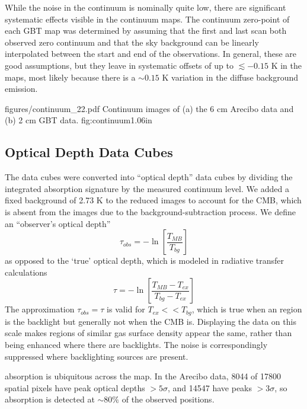 While the noise in the continuum is nominally quite low, there are significant
systematic effects visible in the continuum maps.  The continuum zero-point of
each GBT map was determined by assuming that the first and last scan both
observed zero continuum and that the sky background can be linearly
interpolated between the start and end of the observations.  In general, these
are good assumptions, but they leave in systematic offsets of up to
$\lesssim-0.15$ K in the maps, most likely because there is a $\sim0.15$ K
variation in the diffuse background  emission.



            {figures/continuum_22.pdf}
{Continuum images of (a) the 6 cm Arecibo data and (b) 2 cm GBT
data.} {fig:continuum}{1.0}{6in}




\subsection{Optical Depth Data Cubes}

The data cubes were converted into ``optical depth'' data cubes by dividing the
integrated \formaldehyde absorption signature by the measured continuum level.
We added a fixed background of 2.73 K to the reduced images to account for the
CMB, which is absent from the images due to the background-subtraction
process.  We define an ``observer's optical depth''
\begin{equation}
    \tau_{obs} = -\ln\left[\frac{T_{MB}}{T_{bg}}\right]
\end{equation}
as opposed to the `true' optical depth, which is modeled in radiative transfer
calculations
\begin{equation}
    \tau = -\ln\left[\frac{T_{MB}-T_{ex}}{T_{bg}-T_{ex}}\right]
\end{equation}
The approximation $\tau_{obs} = \tau$ is valid for $T_{ex} << T_{bg}$, which is
true when an \hii region is the backlight but generally not when the CMB is.
Displaying the data on this scale makes regions of similar gas surface density
appear the same, rather than being enhanced where there are backlights.  The
noise is correspondingly suppressed where backlighting sources are present.


\formaldehyde absorption is ubiquitous across the map.  In the Arecibo data,
8044 of 17800 spatial pixels have peak optical depths $>5\sigma$, and 14547
have peaks $>3\sigma$, so \formaldehyde absorption is detected at $\sim80\%$ of
the observed positions.

